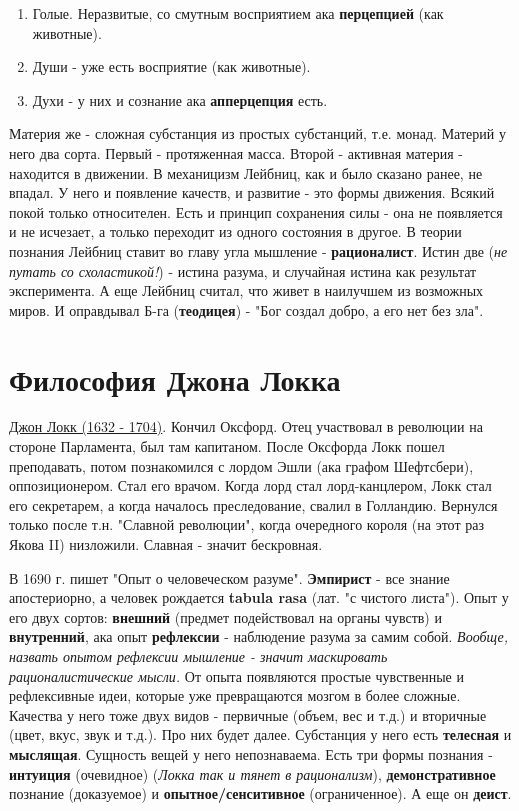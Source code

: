 \begin{enumerate}
\item Голые. Неразвитые, со смутным восприятием ака \textbf{перцепцией} (как животные).
\item Души - уже есть восприятие (как животные).
\item Духи - у них и сознание ака \textbf{апперцепция} есть.
\end{enumerate}
Материя же - сложная субстанция из простых субстанций, т.е. монад. Материй у него два сорта. Первый - протяженная масса.
Второй - активная материя - находится в движении. В механицизм Лейбниц, как и было сказано ранее, не впадал. У него и появление качеств, и развитие - это формы движения.  Всякий покой только относителен. Есть и принцип сохранения силы - она не появляется и не исчезает, а только переходит из одного состояния в другое. В теории познания Лейбниц ставит во главу угла мышление - \textbf{рационалист}. Истин две (\textit{не путать со схоластикой!}) - истина разума, и случайная истина как результат эксперимента. А еще Лейбниц считал, что живет в наилучшем из возможных миров. И оправдывал Б-га (\textbf{теодицея}) - "Бог создал добро, а его нет без зла".


\section{Философия Джона Локка}
\underline{Джон Локк (1632 - 1704)}. Кончил Оксфорд. Отец участвовал в революции на стороне Парламента, был там капитаном. После Оксфорда Локк пошел преподавать, потом познакомился с лордом Эшли (ака графом Шефтсбери), оппозиционером. Стал его врачом. Когда лорд стал лорд-канцлером, Локк стал его секретарем, а когда началось преследование, свалил в Голландию. Вернулся только после т.н. "Славной революции", когда очередного короля (на этот раз Якова II) низложили. Славная - значит бескровная. 

В 1690 г. пишет "Опыт о человеческом разуме". \textbf{Эмпирист} - все  знание апостериорно, а человек рождается \textbf{tabula rasa} (лат. "с чистого листа"). Опыт у его двух сортов: \textbf{внешний} (предмет подействовал на органы чувств) и \textbf{внутренний}, ака опыт \textbf{рефлексии} - наблюдение разума за самим собой. \textit{Вообще, назвать опытом рефлексии мышление - значит маскировать рационалистические мысли.} От опыта появляются простые чувственные и рефлексивные идеи, которые уже превращаются мозгом в более сложные. Качества у него тоже двух видов - первичные (объем, вес и т.д.) и вторичные (цвет, вкус, звук и т.д.). Про них будет далее. Субстанция у него есть \textbf{телесная} и \textbf{мыслящая}. Сущность вещей у него непознаваема. Есть три формы познания - \textbf{интуиция} (очевидное) (\textit{Локка так и тянет в рационализм}), \textbf{демонстративное} познание (доказуемое) и \textbf{опытное/сенситивное} (ограниченное). А еще он \textbf{деист}.

